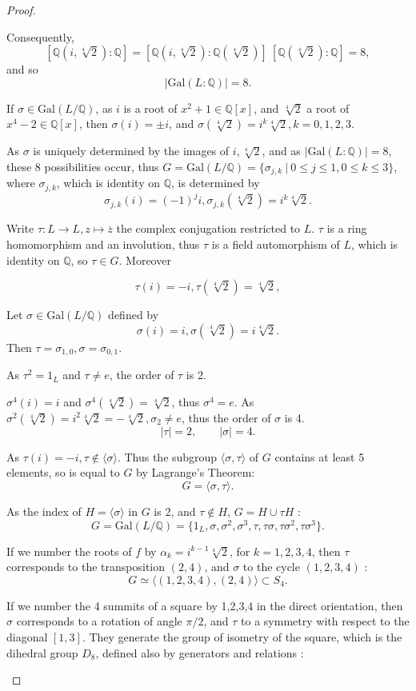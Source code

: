\documentclass[11pt,a4paper]{article}
\newcommand{\Q}{\mathbb{Q}}
\newcommand{\Gal}{\mathrm{Gal}}
\begin{document}
\begin{proof}
\begin{enumerate}
Consequently, 
$$[\Q(i,\sqrt[4]{2}) : \Q] = [\Q(i,\sqrt[4]{2}) : \Q(\sqrt[4]{2})] \ [\Q(\sqrt[4]{2}) : \Q]  = 8,$$
and so
$$\vert \Gal(L:\Q) \vert = 8.$$

If $\sigma \in \Gal(L/\Q)$, as $i$ is a root of $x^2+1 \in \Q[x]$, and $\sqrt[4]{2}$ a root of $x^4-2 \in \Q[x]$, then $\sigma(i) = \pm i$, and $\sigma(\sqrt[4]{2}) = i^k \sqrt[4]{2},k=0,1,2,3$.

As $\sigma$ is uniquely determined by the images of $ i,\sqrt[4]{2}$, and as $\vert \Gal(L:\Q) \vert = 8$, these 8 possibilities occur, thus $G=\Gal(L/\Q) = \{\sigma_{j,k} \ \vert \ 0\leq j \leq1, 0 \leq k \leq 3 \}$, where $\sigma_{j,k}$, which is identity on $\Q$, is determined by
$$\sigma_{j,k}(i) = (-1)^j i, \sigma_{j,k}(\sqrt[4]{2}) = i^k \sqrt[4]{2}.$$

Write $\tau :L \to L, z \mapsto \overline{z}$ the complex conjugation restricted to $L$. $\tau$ is a ring homomorphism and an involution, thus $\tau$ is a field automorphism of $L$, which is identity on $\Q$, so $\tau \in G$. Moreover 

$$ \tau(i) = -i, \tau(\sqrt[4]{2}) = \sqrt[4]{2},$$

Let $\sigma \in \Gal(L/\Q)$ defined by $$\sigma(i)=i, \sigma(\sqrt[4]{2}) = i \sqrt[4]{2}.$$
Then  $\tau = \sigma_{1,0}, \sigma = \sigma_{0,1}$.

As $\tau^2 = 1_L$ and $\tau \neq e$, the order of $\tau$ is 2.

$\sigma^4(i) = i$ and $\sigma^4(\sqrt[4]{2}) = \sqrt[4]{2}$, thus $\sigma^4 = e$. As $\sigma^2(\sqrt[4]{2}) = i^2 \sqrt[4]{2}=-\sqrt[4]{2},\sigma_2 \neq e$, thus the order of $\sigma$ is 4.
$$|\tau| = 2, \qquad |\sigma| = 4.$$

As $\tau(i) = -i, \tau \not \in \langle \sigma \rangle$. Thus the subgroup $\langle \sigma, \tau \rangle$ of $G$ contains at least 5 elements, so is equal to $G$ by Lagrange's Theorem:
$$G = \langle \sigma, \tau \rangle.$$

As the index of  $H = \langle \sigma \rangle$ in $G$ is 2, and $\tau \not \in H$, $G = H \cup \tau H$ :
 $$ G=\Gal(L/\Q) = \{1_{L}, \sigma, \sigma^2, \sigma^3,\tau,  \tau \sigma, \tau \sigma^2, \tau \sigma^3\}.$$

If we number the roots of $f$ by  $\alpha_k=  i^{k-1} \sqrt[4]{2}$, for $k=1,2,3,4$, then $\tau$ corresponds to the transposition $(2,4)$, and $\sigma$ to the cycle $(1,2,3,4)$ :
$$G\simeq \langle(1,2,3,4),(2,4)\rangle \subset S_4.$$

If we number the 4 summits of a square by 1,2,3,4 in the direct orientation, then $\sigma$ corresponds to a rotation of angle $\pi/2$, and $\tau$ to a symmetry with respect to the diagonal $[1,3]$. They generate the group of isometry of the square, which is the dihedral group $D_8$, defined also by generators and relations :


\end{enumerate}
\end{proof}
\end{document}
